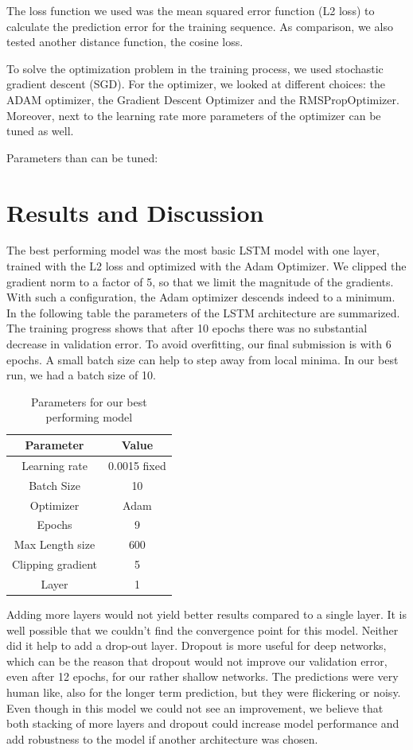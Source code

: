 The loss function we used was the mean squared error function (L2 loss) to calculate the prediction error for the training sequence. As comparison, we also tested another distance function, the cosine loss. 

To solve the optimization problem in the training process, we used stochastic gradient descent (SGD). For the optimizer, we looked at different choices: the ADAM optimizer, the Gradient Descent Optimizer and the RMSPropOptimizer. Moreover, next to the learning rate more parameters of the optimizer can be tuned as well. 

Parameters than can be tuned:


\section{Results and Discussion}

The best performing model was the most basic LSTM model with one layer, trained with the L2 loss and optimized with the Adam Optimizer. We clipped the gradient norm to a factor of 5, so that we limit the magnitude of the gradients. With such a configuration, the Adam optimizer descends indeed to a minimum. In the following table the parameters of the LSTM architecture are summarized. The training progress shows that after 10 epochs there was no substantial decrease in validation error. To avoid overfitting, our final submission is with 6 epochs. A small batch size can help to step away from local minima. In our best run, we had a batch size of 10. 

\begin{table}[]
	\centering
	\caption{Parameters for our best performing model }
	\label{my-label}
	\begin{tabular}{cc}
		Parameter& Value \\
		\hline
		\hline
		Learning rate  &  0.0015 fixed    \\
		Batch Size  & 10 \\
		Optimizer  & Adam  \\
		Epochs  & 9 \\
		Max Length size  &  600 \\
		Clipping gradient &  5\\
		Layer & 1 \\
		\hline
	\end{tabular}
\end{table}

Adding more layers would not yield better results compared to a single layer. It is well possible that we couldn't find the convergence point for this model. Neither did it help to add a drop-out layer. Dropout is more useful for deep networks, which can be the reason that dropout would not improve our validation error, even after 12 epochs, for our rather shallow networks. The predictions were very human like, also for the longer term prediction, but they were flickering or noisy. Even though in this model we could not see an improvement, we believe that both stacking of more layers and dropout could increase model performance and add robustness to the model if another architecture was chosen. 

